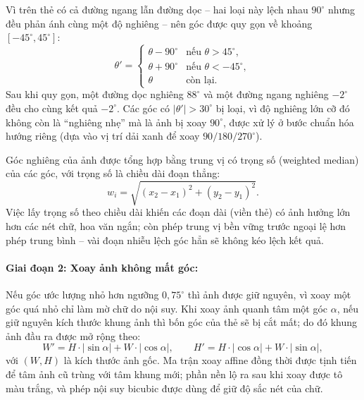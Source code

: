 Vì trên thẻ có cả đường ngang lẫn đường dọc -- hai loại này lệch nhau $90^\circ$ nhưng đều phản ánh cùng một độ nghiêng -- nên góc được quy gọn về khoảng $[-45^\circ, 45^\circ]$:
\begin{equation}
  \theta' =
  \begin{cases}
    \theta - 90^\circ & \text{nếu } \theta > 45^\circ, \\
    \theta + 90^\circ & \text{nếu } \theta < -45^\circ, \\
    \theta            & \text{còn lại.}
  \end{cases}
\end{equation}
Sau khi quy gọn, một đường dọc nghiêng $88^\circ$ và một đường ngang nghiêng $-2^\circ$ đều cho cùng kết quả $-2^\circ$. Các góc có $|\theta'| > 30^\circ$ bị loại, vì độ nghiêng lớn cỡ đó không còn là ``nghiêng nhẹ'' mà là ảnh bị xoay $90^\circ$, được xử lý ở bước chuẩn hóa hướng riêng (dựa vào vị trí dải xanh để xoay $90/180/270^\circ$).

Góc nghiêng của ảnh được tổng hợp bằng trung vị có trọng số (weighted median) của các góc, với trọng số là chiều dài đoạn thẳng:
\begin{equation}
  w_i = \sqrt{(x_2 - x_1)^2 + (y_2 - y_1)^2}.
\end{equation}
Việc lấy trọng số theo chiều dài khiến các đoạn dài (viền thẻ) có ảnh hưởng lớn hơn các nét chữ, hoa văn ngắn; còn phép trung vị bền vững trước ngoại lệ hơn phép trung bình -- vài đoạn nhiễu lệch góc hẳn sẽ không kéo lệch kết quả.

\paragraph{Giai đoạn 2: Xoay ảnh không mất góc:}
Nếu góc ước lượng nhỏ hơn ngưỡng $0{,}75^\circ$ thì ảnh được giữ nguyên, vì xoay một góc quá nhỏ chỉ làm mờ chữ do nội suy. Khi xoay ảnh quanh tâm một góc $\alpha$, nếu giữ nguyên kích thước khung ảnh thì bốn góc của thẻ sẽ bị cắt mất; do đó khung ảnh đầu ra được mở rộng theo:
\begin{equation}
  W' = H \cdot |\sin\alpha| + W \cdot |\cos\alpha|, \qquad H' = H \cdot |\cos\alpha| + W \cdot |\sin\alpha|,
\end{equation}
với $(W, H)$ là kích thước ảnh gốc. Ma trận xoay affine đồng thời được tịnh tiến để tâm ảnh cũ trùng với tâm khung mới; phần nền lộ ra sau khi xoay được tô màu trắng, và phép nội suy bicubic được dùng để giữ độ sắc nét của chữ.

